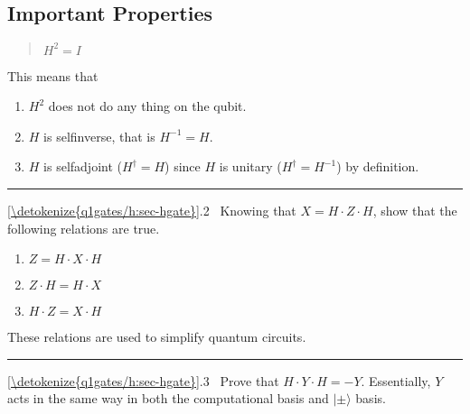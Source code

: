 \documentclass[letterpaper,10pt,english]{jupyterBook}
\begin{document}
\subsection{Important Properties}
\label{\detokenize{q1gates/h:important-properties}}\begin{quote}

\sphinxAtStartPar
\(H^2 = I\)
\end{quote}

\sphinxAtStartPar
This means that
\begin{enumerate}
%
\item {}
\sphinxAtStartPar
\(H^2\) does not do any thing on the qubit.

\item {}
\sphinxAtStartPar
\(H\) is  self\sphinxhyphen{}inverse, that is \(H^{-1} = H\).

\item {}
\sphinxAtStartPar
\(H\) is self\sphinxhyphen{}adjoint (\(H^\dagger = H\)) since \(H\) is unitary (\(H^\dagger = H^{-1}\)) by definition.

\end{enumerate}


\bigskip\hrule\bigskip


\sphinxAtStartPar
{} \hyperref[\detokenize{q1gates/h:sec-hgate}]{\ref{\detokenize{q1gates/h:sec-hgate}}}.2   Knowing that \(X = H \cdot Z \cdot H\), show that the following relations are true.
\begin{enumerate}
%
\item {}
\sphinxAtStartPar
\(Z = H \cdot X \cdot H\)

\item {}
\sphinxAtStartPar
\(Z \cdot H = H \cdot X\)

\item {}
\sphinxAtStartPar
\(H \cdot Z = X \cdot H\)

\end{enumerate}

\sphinxAtStartPar
These relations are used to simplify quantum circuits.


\bigskip\hrule\bigskip


\sphinxAtStartPar
{} \hyperref[\detokenize{q1gates/h:sec-hgate}]{\ref{\detokenize{q1gates/h:sec-hgate}}}.3   Prove that \(H \cdot Y \cdot H = -Y\).   Essentially, \(Y\) acts in the same way in both the computational basis and \(|\pm\rangle\) basis.
\end{document}
